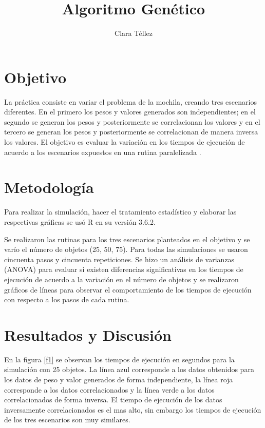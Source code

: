 \documentclass{article}
\begin{document}
\title{\textbf{Algoritmo Gen\'etico}}
\author{Clara T\'ellez}
\maketitle

\section{Objetivo}\label{obj}

La pr\'actica consiste en variar el problema de la mochila, creando tres escenarios diferentes.  En el primero los pesos y valores generados son independientes; en el segundo se generan los pesos y posteriormente se correlacionan los valores y en el tercero se generan los pesos y posteriormente se correlacionan de manera inversa los valores.  El objetivo es evaluar la variaci\'on en los tiempos de ejecuci\'on de acuerdo a los escenarios expuestos en una rutina paralelizada \cite{eli}.

\section{Metodolog\'ia}\label{met}

Para realizar la simulaci\'on, hacer el tratamiento estad\'istico y elaborar las respectivas gr\'aficas se us\'o R en su versi\'on 3.6.2.

Se realizaron las rutinas para los tres escenarios planteados en el objetivo y se var\'io el n\'umero de objetos (25, 50, 75).  Para todas las simulaciones se usaron cincuenta pasos y cincuenta repeticiones.  Se hizo un an\'alisis de varianzas (ANOVA) para evaluar si existen diferencias significativas en los tiempos de ejecuci\'on de acuerdo a la variaci\'on en el n\'umero de objetos y se realizaron gr\'aficos de l\'ineas para observar el comportamiento de los tiempos de ejecuci\'on con respecto a los pasos de cada rutina.

\section{Resultados y Discusi\'on}\label{res}

En la figura \ref{f1}  se observan los tiempos de ejecuci\'on en segundos para la simulaci\'on con 25 objetos.  La l\'inea azul corresponde a los datos obtenidos para los datos de peso y valor generados de forma independiente, la l\'inea roja corresponde a los datos correlacionados y la l\'inea verde a los datos correlacionados de forma inversa.  El tiempo de ejecuci\'on de los datos inversamente correlacionados es el mas alto, sin embargo los tiempos de ejecuci\'on de los tres escenarios son muy similares.
\end{document}
